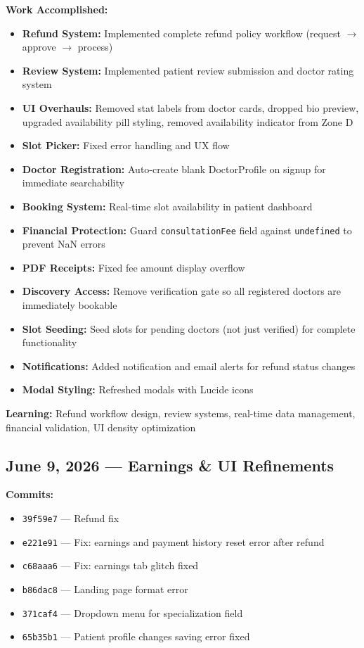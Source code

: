 \documentclass[11pt,a4paper]{article}
\begin{document}
\textbf{Work Accomplished:}
\begin{itemize}
  \item \textbf{Refund System:} Implemented complete refund policy workflow
        (request $\rightarrow$ approve $\rightarrow$ process)
  \item \textbf{Review System:} Implemented patient review submission and doctor rating system
  \item \textbf{UI Overhauls:} Removed stat labels from doctor cards, dropped bio preview,
        upgraded availability pill styling, removed availability indicator from Zone D
  \item \textbf{Slot Picker:} Fixed error handling and UX flow
  \item \textbf{Doctor Registration:} Auto-create blank DoctorProfile on signup for immediate
        searchability
  \item \textbf{Booking System:} Real-time slot availability in patient dashboard
  \item \textbf{Financial Protection:} Guard \texttt{consultationFee} field against
        \texttt{undefined} to prevent NaN errors
  \item \textbf{PDF Receipts:} Fixed fee amount display overflow
  \item \textbf{Discovery Access:} Remove verification gate so all registered doctors are
        immediately bookable
  \item \textbf{Slot Seeding:} Seed slots for pending doctors (not just verified) for complete
        functionality
  \item \textbf{Notifications:} Added notification and email alerts for refund status changes
  \item \textbf{Modal Styling:} Refreshed modals with Lucide icons
\end{itemize}

\textbf{Learning:} Refund workflow design, review systems, real-time data management,
financial validation, UI density optimization

\subsection{June 9, 2026 — Earnings \& UI Refinements}

\textbf{Commits:}
\begin{itemize}
  \item \texttt{39f59e7} — Refund fix
  \item \texttt{e221e91} — Fix: earnings and payment history reset error after refund
  \item \texttt{c68aaa6} — Fix: earnings tab glitch fixed
  \item \texttt{b86dac8} — Landing page format error
  \item \texttt{371caf4} — Dropdown menu for specialization field
  \item \texttt{65b35b1} — Patient profile changes saving error fixed
\end{itemize}
\end{document}
